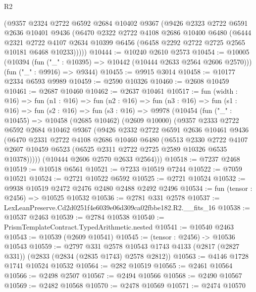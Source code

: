 \begin{lexlean}{R2}
\begin{coremodule}
    (@9357
      @2324
      @2722
      @6592
      @2684
      @10402
      @9367
      (@9426
        @2323
        @2722
        @6591
        @2636
        @10401
        @9436
        (@6470
          @2322
          @2722
          @4108
          @2686
          @10400
          @6480
          (@6444
            @2321
            @2722
            @4107
            @2634
            @10399
            @6456
            (@6458 @2292 @2722 @2725 @2565 @10181 @6468 @10233)))))
@10444 := @10240 @2610 @2573
@10454 := @10005
    (@10394 (fun ("_" : @10395) => @10442 (@10444 @2633 @2564 @2606 @2570)))
    (fun ("_" : @9916) => @9344)
@10455 := @9915 @3014
@10458 := @10177 @2334 @6593 @9989
@10459 := @2590 @10326
@10460 := @2608 @10459
@10461 := @2687 @10460
@10462 := @2637 @10461
@10517 := fun (width : @16) =>
  fun (n1 : @16) =>
  fun (n2 : @16) =>
  fun (n3 : @16) =>
  fun (s1 : @16) =>
  fun (s2 : @16) =>
  fun (s3 : @16) =>
  @9978
    (@10454
      (fun ("_" : @10455) =>
      @10458
        (@2685 @10462)
        (@2609 @10000)
        (@9357
          @2333
          @2722
          @6592
          @2684
          @10462
          @9367
          (@9426
            @2332
            @2722
            @6591
            @2636
            @10461
            @9436
            (@6470
              @2331
              @2722
              @4108
              @2686
              @10460
              @6480
              (@6513
                @2330
                @2722
                @4107
                @2607
                @10459
                @6523
                (@6525 @2311 @2722 @2725 @2589 @10326 @6535 @10378)))))
        (@10444 @2606 @2570 @2633 @2564)))
@10518 := @7237 @2468
@10519 := @10518 @6561
@10521 := @7233 @10519 @7244
@10522 := @7059 @10521
@10524 := @2721 @10522 @6592
@10525 := @2721 @10524
@10532 := @9938 @10519 @2472 @2476 @2480 @2488 @2492 @2496
@10534 := fun (tensor : @2456) => @10525 @10532
@10536 := @2781 @331 @2578
@10537 := LexLeanPreserve.Cd2d0251f4e6039e06d309ca02fbbe182.R2.__fits_16
@10538 := @10537 @2463
@10539 := @2784 @10538
@10540 := PrismTemplateContract.TypedArithmetic.nested
@10541 := @10540 @2463
@10543 := @10539 (@2609 @10541)
@10545 := (tensor : @2456) -> @10536 @10543
@10559 := @2797
    @331
    @2578
    @10543
    @1743
    @4133
    (@2817 (@2827 @331))
    (@2833 (@2834 (@2835 @1743) @2578 @2812))
@10563 := @4146 @1728 @1741 @10524 @10532
@10564 := @282 @10519
@10565 := @2461 @10564
@10566 := @2498 @2507
@10567 := @2494 @10566
@10568 := @2490 @10567
@10569 := @2482 @10568
@10570 := @2478 @10569
@10571 := @2474 @10570

\end{coremodule}
\end{lexlean}
